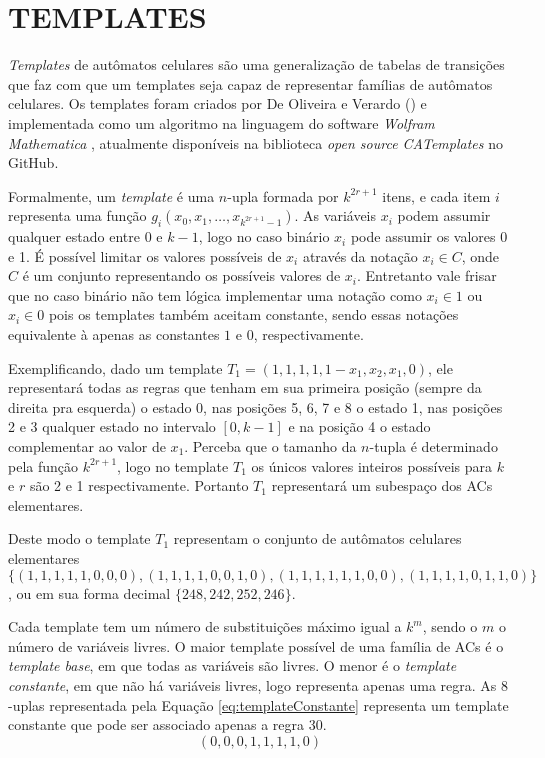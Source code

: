 \section{TEMPLATES}
\label{sec:templates}

\textit{Templates} de autômatos celulares são uma generalização de tabelas de transições que faz com que um templates seja capaz de representar famílias de autômatos celulares. Os templates foram criados por De Oliveira e Verardo (\citeyear{deOliveira2014}) e implementada como um algoritmo na linguagem do software \textit{Wolfram Mathematica} \cite{woframMathematica10}, atualmente disponíveis na biblioteca \textit{open source CATemplates} \cite{CATemplates} no GitHub.

Formalmente, um \textit{template} é uma $n$-upla formada por $k^{2r+1}$ itens, e cada item $i$ representa uma função $g_i(x_0,x_1,\dots,x_{k^{2r+1}-1})$. As variáveis $x_i$ podem assumir qualquer estado entre 0 e $k-1$, logo no caso binário $x_i$ pode assumir os valores 0 e 1. É possível limitar os valores possíveis de $x_i$ através da notação $x_i \in C$, onde $C$ é um conjunto representando os possíveis valores de $x_i$. Entretanto vale frisar que no caso binário não tem lógica implementar uma notação como $x_i \in {1}$ ou $x_i \in {0}$ pois os templates também aceitam constante, sendo essas notações equivalente à apenas as constantes $1$ e $0$, respectivamente.

Exemplificando, dado um template $T_1 = (1,1,1,1,1-x_1,x_2,x_1,0)$, ele representará todas as regras que tenham em sua primeira posição (sempre da direita pra esquerda) o estado 0, nas posições 5, 6, 7 e 8 o estado 1, nas posições 2 e 3 qualquer estado no intervalo $[0,k-1]$ e na posição 4 o estado complementar ao valor de $x_1$. Perceba que o tamanho da $n$-tupla é determinado pela função $k^{2r+1}$, logo no template $T_1$ os únicos valores inteiros possíveis para $k$ e $r$ são 2 e 1 respectivamente. Portanto $T_1$ representará um subespaço dos ACs elementares.

Deste modo o template $T_1$ representam o conjunto de autômatos celulares elementares $\{(1,1,1,1,1,0,0,0),(1,1,1,1,0,0,1,0),(1,1,1,1,1,1,0,0),(1,1,1,1,0,1,1,0)\}$, ou em sua forma decimal $\{248,242,252,246\}$.

Cada template tem um número de substituições máximo igual a $k^m$, sendo o $m$ o número de variáveis livres. O maior template possível de uma família de ACs é o \textit{template base}, em que todas as variáveis são livres. O menor é o \textit{template constante}, em que não há variáveis livres, logo representa apenas uma regra. As $8$-uplas representada pela Equação \ref{eq:templateConstante} representa um template constante que pode ser associado apenas a regra 30. 
\begin{equation}
(0,0,0,1,1,1,1,0)
\label{eq:templateConstante}
\end{equation}

